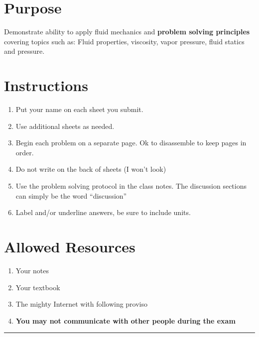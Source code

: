 \documentclass[12pt]{article}
\begin{document}
\section*{ }
\section*{Purpose}
Demonstrate ability to apply fluid mechanics and \textbf{problem solving principles} covering topics such as: Fluid properties, viscosity, vapor pressure, fluid statics and pressure.
\section*{Instructions}
\begin{enumerate}
\item Put your name on each sheet you submit.  
\item Use additional sheets as needed. 
\item Begin each problem on a separate page.  Ok to disassemble to keep pages in order.
\item Do not write on the back of sheets (I won't look)
\item Use the problem solving protocol in the class notes.  The discussion sections can simply be the word ``discussion'' 
\item Label and/or underline answers, be sure to include units.
\end{enumerate}
\section*{Allowed Resources}
\begin{enumerate}
\item Your notes
\item Your textbook
\item The mighty Internet with following proviso
\item  \textbf{You may not communicate with other people during the exam}
\end{enumerate}
\noindent\rule{\linewidth}{0.4pt}
\clearpage
\end{document}
